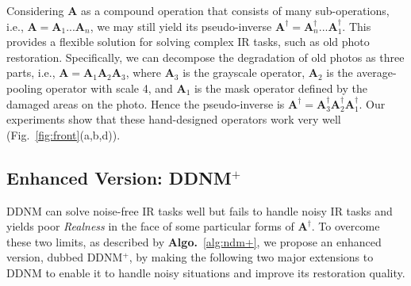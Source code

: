 \documentclass{article} \usepackage{iclr2023_conference,times}
\begin{document}
Considering $\mathbf{A}$ as a compound operation that consists of many sub-operations, i.e., $\mathbf{A}=\mathbf{A}_{1}...\mathbf{A}_{n}$, we may still yield its pseudo-inverse $\mathbf{A}^{\dagger}=\mathbf{A}_{n}^{\dagger}...\mathbf{A}_{1}^{\dagger}$. This provides a flexible solution for solving complex IR tasks, such as old photo restoration. Specifically, we can decompose the degradation of old photos as three parts, i.e., $\mathbf{A}=\mathbf{A}_{1}\mathbf{A}_{2}\mathbf{A}_{3}$, where $\mathbf{A}_{3}$ is the grayscale operator, $\mathbf{A}_{2}$ is the average-pooling operator with scale 4, and $\mathbf{A}_{1}$ is the mask operator defined by the damaged areas on the photo. Hence the pseudo-inverse is $\mathbf{A}^{\dagger}=\mathbf{A}_{3}^{\dagger}\mathbf{A}_{2}^{\dagger}\mathbf{A}_{1}^{\dagger}$. Our experiments show that these hand-designed operators work very well (Fig.~\ref{fig:front}(a,b,d)).



\subsection{Enhanced Version: DDNM$^+$}
\label{cp:DDNM+}
DDNM can solve noise-free IR tasks well but fails to handle noisy IR tasks and yields poor \textit{Realness} in the face of some particular forms of $\mathbf{A}^{\dagger}$. To overcome these two limits, as described by \textbf{Algo.}~\ref{alg:ndm+}, we propose an enhanced version, dubbed DDNM$^+$, by making the following two major extensions to DDNM to enable it to handle noisy situations and improve its restoration quality. 
\end{document}
